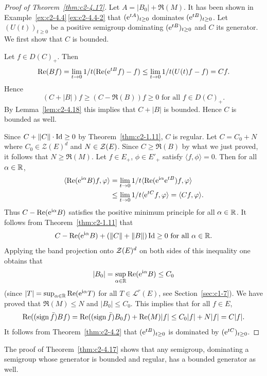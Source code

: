 \begin{proof}[Proof of Theorem~\ref{thm:c2-4.17}]
Let $A = |B_{0}| + \Re(M)$. 
It has been shown in Example~\ref{ex:c2-4.4}\,\ref{ex:c2-4.4-2} that $(\eu^{tA})_{t \geq 0}$ dominates $(\eu^{tB})_{t \geq 0}$.
Let $(U(t))_{t \geq 0}$ be a positive semigroup dominating $(\eu^{tB})_{t \geq 0}$ and $C$ its generator.
We first show that $C$ is bounded.

Let $f \in D(C)_{+}$. Then 
\[
\Re(Bf) = \lim_{t \to 0} 1/t(\Re(\eu^{tB}f) - f) \leq \lim_{t \to 0} 1/t(U(t)f - f) = Cf .
\]
Hence 
\[
(C + |B|)f \geq (C - \Re(B))f \geq 0 \text{ for all } f \in D(C)_{+} .
\]
By Lemma~\ref{lem:c2-4.18} this implies that $C + |B|$ is bounded.
Hence $C$ is bounded as well.

Since $C + \|C\| \cdot \Id \geq 0$ by Theorem~\ref{thm:c2-1.11}, $C$ is regular.
Let $C = C_{0} + N$ where $C_{0} \in \mathcal{Z}(E)^{d}$ and $N \in \mathcal{Z}(E)$.
Since $C \geq \Re(B)$ by what we just proved, it follows that $N \geq \Re(M)$.
Let $f \in E_{+}$, $\phi \in E'_{+}$ satisfy $\langle f,\phi \rangle = 0$.
Then for all $\alpha \in \mathbb{R}$,
\begin{align*}
\langle \Re(\eu^{\im \alpha}B)f,\phi \rangle &= \lim_{t \to 0}1/t \langle \Re(\eu^{\im \alpha}\eu^{tB})f,\phi \rangle \\
&\leq \lim_{t \to 0}1/t \langle \eu^{tC}f,\phi \rangle 
= \langle Cf,\phi \rangle.
\end{align*}
Thus $C - \mathop{}\!\mathrm{Re}(\mathrm{e}^{\mathrm{i} \alpha}B)$ satisfies the positive minimum principle  
for all $\alpha \in \mathbb{R}$.
It follows from Theorem~\ref{thm:c2-1.11} that 
\[
C - \Re(\eu^{\im \alpha}B) + (\|C\|+\|B\|)\Id \geq 0 \text{ for all } \alpha \in \R .
\]
Applying the band projection onto $\mathcal{Z}(E)^{d}$ on both sides of this inequality one obtains that
\[
|B_{0}| = \sup_{\alpha \in \R}\Re(\eu^{\im \alpha}B) \leq C_{0} 
\]
(since $|T| = \sup_{\alpha \in \mathbb{R}}\mathop{}\!\mathrm{Re}(\mathrm{e}^{\mathrm{i} \alpha}T)$ for all $T \in \mathcal{L}^{r}(E)$, see Section~\ref{sec:c1-7}).
We have proved that $\Re(M) \leq N$ and $|B_{0}| \leq C_{0}$.
This implies that for all $f \in E$,
\[
\Re((\sign  \bar{f})Bf) = \Re((\sign  \bar{f})B_{0}f) + \Re(M)|f| \leq C_{0}|f| + N|f| = C|f| .
\]
It follows from Theorem~\ref{thm:c2-4.2}   that $(\eu^{tB})_{t \geq 0}$ is dominated by $(\eu^{tC})_{t \geq 0}$.
\end{proof}
\begin{remark*}
The proof of Theorem~\ref{thm:c2-4.17}   shows that any semigroup, dominating a semigroup whose generator is bounded and regular, has a bounded generator as well.
\end{remark*}
